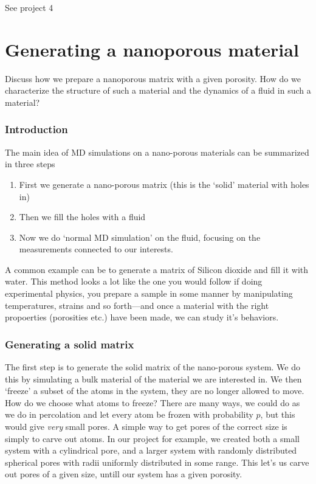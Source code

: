 \documentclass[a4paper, 11pt, notitlepage, english]{article}
\begin{document}
See project 4

\clearpage



\section{Generating a nanoporous material}
Discuss how we prepare a nanoporous matrix with a given porosity. How do we characterize the structure of such a material and the dynamics of a fluid in such
a material?

\subsubsection*{Introduction}
The main idea of MD simulations on a nano-porous materials can be summarized in three steps
\begin{enumerate}
	\item First we generate a nano-porous matrix (this is the `solid' material with holes in)
	\item Then we fill the holes with a fluid
	\item Now we do `normal MD simulation' on the fluid, focusing on the measurements connected to our interests. 
\end{enumerate}
A common example can be to generate a matrix of Silicon dioxide and fill it with water. This method looks a lot like the one you would follow if doing experimental physics, you prepare a sample in some manner by manipulating temperatures, strains and so forth---and once a material with the right propoerties (porosities etc.) have been made, we can study it's behaviors.

\subsubsection*{Generating a solid matrix}

The first step is to generate the solid matrix of the nano-porous system. We do this by simulating a bulk material of the material we are interested in. We then `freeze' a subset of the atoms in the system, they are no longer allowed to move. How do we choose what atoms to freeze? There are many ways, we could do as we do in percolation and let every atom be frozen with probability $p$, but this would give \emph{very} small pores. A simple way to get pores of the correct size is simply to carve out atoms. In our project for example, we created both a small system with a cylindrical pore, and a larger system with randomly distributed spherical pores with radii uniformly distributed in some range. This let's us carve out pores of a given size, untill our system has a given porosity.
\end{document}
